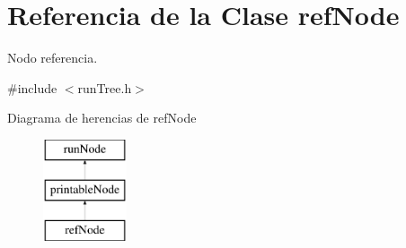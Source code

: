 \hypertarget{classrefNode}{\section{Referencia de la Clase ref\-Node}
\label{classrefNode}
}


Nodo referencia.  




{\ttfamily \#include $<$run\-Tree.\-h$>$}

Diagrama de herencias de ref\-Node\begin{figure}[H]
\begin{center}
\leavevmode
\includegraphics[height=3.000000cm]{classrefNode}
\end{center}
\end{figure}
